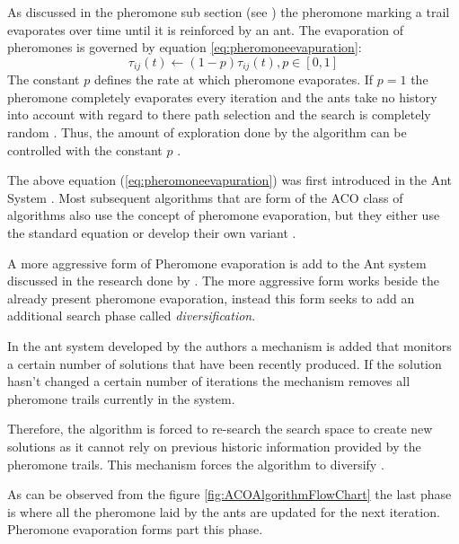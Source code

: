 As discussed in the pheromone sub section (see \pageref{sec:pheromonetrail}) the pheromone marking a trail evaporates over time until it is reinforced by an ant. The evaporation of pheromones is governed by equation \ref{eq:pheromoneevapuration}\cite{CompuIntelligenceIntro,AntsAndStigmergy,AntIntroTrends,AntSurvey}:
\begin{equation}
\label{eq:pheromoneevapuration}
	\tau_{ij}(t) \leftarrow (1-p)\tau_{ij}(t), p\in [0,1]
\end{equation}
The constant $p$ defines the rate at which pheromone evaporates. If $p=1$ the pheromone completely evaporates every iteration and the ants take no history into account with regard to there path selection and the search is completely random \cite{CompuIntelligenceIntro,AntsAndStigmergy}. Thus, the amount of exploration done by the algorithm can be controlled with the constant $p$ \cite{CompuIntelligenceIntro,AntsAndStigmergy}.

The above equation (\ref{eq:pheromoneevapuration}) was first introduced in the Ant System \cite{CompuIntelligenceIntro,AntsAndStigmergy,AntIntroTrends,AntSurvey}. Most subsequent algorithms that are form of the ACO class of algorithms also use the concept of pheromone evaporation, but they either use the standard equation or develop their own variant \cite{CompuIntelligenceIntro,AntsAndStigmergy,AntIntroTrends,AntSurvey}.

A more aggressive form of Pheromone evaporation  is add to the Ant system discussed in the research done by \cite{AntQAP}. The more aggressive form works beside the already present pheromone evaporation, instead this form seeks to add an additional search phase called \emph{diversification}. 

In the ant system developed by the authors a mechanism is added that monitors a certain number of solutions that have been recently produced. If the solution hasn't changed a certain number of iterations the mechanism removes all pheromone trails currently in the system. 

Therefore, the algorithm is forced to re-search the search space to create new solutions as it cannot rely on previous historic information provided by the pheromone trails. This mechanism forces the algorithm to diversify \cite{AntQAP}.

As can be observed from the figure \ref{fig:ACOAlgorithmFlowChart} the last phase is where all the pheromone laid by the ants are updated for the next iteration. Pheromone evaporation forms part this phase.
